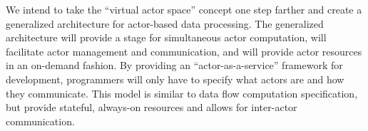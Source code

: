 \documentclass[11pt,letterpaper]{article}
\begin{document}
We intend to take the ``virtual actor space'' concept one step farther and create a generalized architecture for actor-based data processing. The generalized architecture will provide a stage for simultaneous actor computation, will facilitate actor management and communication, and will provide actor resources in an on-demand fashion. By providing an ``actor-as-a-service'' framework for development, programmers will only have to specify what actors are and how they communicate. This model is similar to data flow computation specification, but provide stateful, always-on resources and allows for inter-actor communication.



%
%
\end{document}
